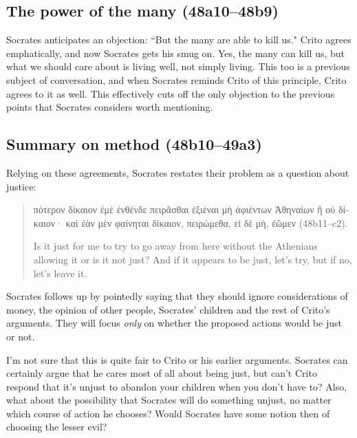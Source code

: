 \documentclass[12pt,letterpaper]{article}
\begin{document}

\subsection*{The power of the many (48a10--48b9)}

Socrates anticipates an objection: ``But the many are able to kill us."
Crito agrees emphatically, and now Socrates gets his smug on. Yes, the many
can kill us, but what we should care about is living well, not simply
living. This too is a previous subject of conversation, and when Socrates
reminds Crito of this principle, Crito agrees to it as well. This
effectively cuts off the only objection to the previous points that
Socrates considers worth mentioning.


\subsection*{Summary on method (48b10--49a3)}

Relying on these agreements, Socrates restates their problem as a question
about justice:

\begin{quote}

    \textgreek{πότερον δίκαιον ἐμὲ ἐνθένδε πειρᾶσθαι ἐξιέναι μὴ ἀφιέντων Ἀθηναίων ἢ οὐ δίκαιον· καὶ ἐὰν μὲν φαίνηται δίκαιον, πειρώμεθα, εἰ δὲ μή, ἐῶμεν} (48b11--c2).

    Is it just for me to try to go away from here without the Athenians allowing it or is it not just? And if it appears to be just, let's try, but if no, let's leave it.

\end{quote}

Socrates follows up by pointedly saying that they should ignore considerations of money, the opinion of other people, Socrates' children and the rest of Crito's arguments. They will focus \emph{only} on whether the proposed actions would be just or not.

I'm not sure that this is quite fair to Crito or his earlier arguments. Socrates can certainly argue that he cares most of all about being just, but can't Crito respond that it's unjust to abandon your children when you don't have to? Also, what about the possibility that Socrates will do something unjust, no matter which course of action he chooses? Would Socrates have some notion then of choosing the lesser evil?
\end{document}

